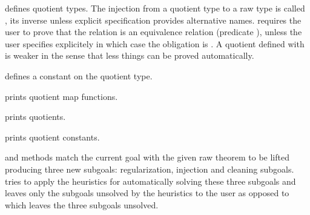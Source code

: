 \begin{isabellebody}
\begin{isamarkuptext}
  \begin{description}

  \item \hyperlink{command.HOL.quotient-type}{\mbox{}} defines quotient types. The
  injection from a quotient type to a raw type is called , its inverse  unless explicit \hyperlink{keyword.HOL.morphisms}{\mbox{}} specification provides alternative names. \hyperlink{command.HOL.quotient-type}{\mbox{}} requires the user to prove that the relation
  is an equivalence relation (predicate ), unless the
  user specifies explicitely  in which case the
  obligation is .  A quotient defined with  is weaker in the sense that less things can be proved
  automatically.

  \item \hyperlink{command.HOL.quotient-definition}{\mbox{}} defines a constant on
  the quotient type.

  \item \hyperlink{command.HOL.print-quotmaps}{\mbox{}} prints quotient map
  functions.

  \item \hyperlink{command.HOL.print-quotients}{\mbox{}} prints quotients.

  \item \hyperlink{command.HOL.print-quotconsts}{\mbox{}} prints quotient constants.

  \item \hyperlink{method.HOL.lifting}{\mbox{}} and \hyperlink{method.HOL.lifting-setup}{\mbox{}}
    methods match the current goal with the given raw theorem to be
    lifted producing three new subgoals: regularization, injection and
    cleaning subgoals. \hyperlink{method.HOL.lifting}{\mbox{}} tries to apply the
    heuristics for automatically solving these three subgoals and
    leaves only the subgoals unsolved by the heuristics to the user as
    opposed to \hyperlink{method.HOL.lifting-setup}{\mbox{}} which leaves the three
    subgoals unsolved.


\end{description}
\end{isamarkuptext}
\end{isabellebody}
